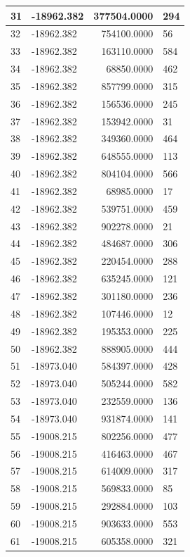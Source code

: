 \documentclass[]{book}
\theoremstyle{definition}
\theoremstyle{definition}
\theoremstyle{definition}
\theoremstyle{remark}
\begin{document}
\begin{tabular}{l|l|r|l}
\hline
31 & -18962.382 & 377504.0000 & 294\\
\hline
32 & -18962.382 & 754100.0000 & 56\\
\hline
33 & -18962.382 & 163110.0000 & 584\\
\hline
34 & -18962.382 & 68850.0000 & 462\\
\hline
35 & -18962.382 & 857799.0000 & 315\\
\hline
36 & -18962.382 & 156536.0000 & 245\\
\hline
37 & -18962.382 & 153942.0000 & 31\\
\hline
38 & -18962.382 & 349360.0000 & 464\\
\hline
39 & -18962.382 & 648555.0000 & 113\\
\hline
40 & -18962.382 & 804104.0000 & 566\\
\hline
41 & -18962.382 & 68985.0000 & 17\\
\hline
42 & -18962.382 & 539751.0000 & 459\\
\hline
43 & -18962.382 & 902278.0000 & 21\\
\hline
44 & -18962.382 & 484687.0000 & 306\\
\hline
45 & -18962.382 & 220454.0000 & 288\\
\hline
46 & -18962.382 & 635245.0000 & 121\\
\hline
47 & -18962.382 & 301180.0000 & 236\\
\hline
48 & -18962.382 & 107446.0000 & 12\\
\hline
49 & -18962.382 & 195353.0000 & 225\\
\hline
50 & -18962.382 & 888905.0000 & 444\\
\hline
51 & -18973.040 & 584397.0000 & 428\\
\hline
52 & -18973.040 & 505244.0000 & 582\\
\hline
53 & -18973.040 & 232559.0000 & 136\\
\hline
54 & -18973.040 & 931874.0000 & 141\\
\hline
55 & -19008.215 & 802256.0000 & 477\\
\hline
56 & -19008.215 & 416463.0000 & 467\\
\hline
57 & -19008.215 & 614009.0000 & 317\\
\hline
58 & -19008.215 & 569833.0000 & 85\\
\hline
59 & -19008.215 & 292884.0000 & 103\\
\hline
60 & -19008.215 & 903633.0000 & 553\\
\hline
61 & -19008.215 & 605358.0000 & 321\\

\end{tabular}
\end{document}
